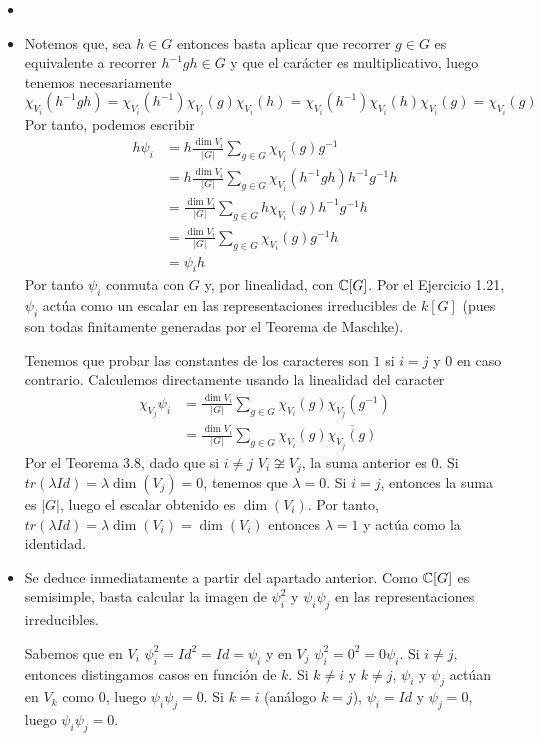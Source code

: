 \documentclass[twoside]{article}
\begin{document}
\begin{solucion}
\begin{itemize}
\item[]
\item Notemos que, sea $h\in G$ entonces basta aplicar que recorrer $g \in G$ es equivalente a recorrer $h^{-1}gh\in G$ y que el carácter es multiplicativo, luego tenemos necesariamente
$$
\chi_{V_i}(h^{-1}gh) = \chi_{V_i}(h^{-1})\chi_{V_i}(g)\chi_{V_i}(h)= \chi_{V_i}(h^{-1})\chi_{V_i}(h)\chi_{V_i}(g) = \chi_{V_i}(g)
$$
Por tanto, podemos escribir
\begin{align*}
h \psi_i &=  h \frac{\dim V_i}{|G|}\sum_{g\in G}\chi_{V_i}(g)g^{-1}\\
&= h \frac{\dim V_i}{|G|}\sum_{g\in G}\chi_{V_i}(h^{-1}gh)h^{-1}g^{-1}h\\
&= \frac{\dim V_i}{|G|}\sum_{g\in G}h\chi_{V_i}(g)h^{-1}g^{-1}h\\
&=\frac{\dim V_i}{|G|}\sum_{g\in G}\chi_{V_i}(g)g^{-1} h\\
&=\psi_i h
\end{align*}
Por tanto $\psi_i$ conmuta con $G$ y, por linealidad, con $\mathbb{C}[G]$. Por el Ejercicio 1.21, $\psi_i$ actúa como un escalar en las representaciones irreducibles de $k[G]$ (pues son todas finitamente generadas por el Teorema de Maschke). 

Tenemos que probar las constantes de los caracteres son $1$ si $i=j$ y $0$ en caso contrario. Calculemos directamente usando la linealidad del caracter
\begin{align*}
\chi_{V_j}  \psi_i &= \frac{\dim V_i}{|G|}\sum_{g\in G}\chi_{V_i}(g)\chi_{V_j}(g^{-1})\\
& = \frac{\dim V_i}{|G|}\sum_{g\in G}\chi_{V_i}(g)\overline{\chi_{V_j}(g)}
\end{align*}
Por el Teorema 3.8, dado que si $i\neq j$ $V_i \not \cong V_j$, la suma anterior es $0$. Si $tr(\lambda Id) = \lambda \dim(V_j) = 0$, tenemos que $\lambda = 0$. Si $i=j$, entonces la suma es $|G|$, luego el escalar obtenido es $\dim (V_i)$. Por tanto, $tr(\lambda Id) = \lambda \dim(V_i) = \dim(V_i)$ entonces $\lambda = 1$ y actúa como la identidad.
\item Se deduce inmediatamente a partir del apartado anterior. Como $\mathbb{C}[G]$ es semisimple, basta calcular la imagen de $\psi_i^2$ y $\psi_i \psi_j$ en las representaciones irreducibles. 

Sabemos que en $V_i$ $\psi_i^2 = Id^2 = Id = \psi_i$ y en $V_j$ $\psi_i^2 =0^2=0  \psi_i$. Si $i \neq j$, entonces distingamos casos en función de $k$. Si $k\neq i$ y $k\neq j$, $\psi_i$ y $\psi_j$ actúan en $V_k$ como $0$, luego $\psi_i\psi_j =0$. Si $k=i$ (análogo $k=j$), $\psi_i = Id$ y $\psi_j = 0$, luego $\psi_i\psi_j = 0$.	
\end{itemize}
\end{solucion}
\end{document}
